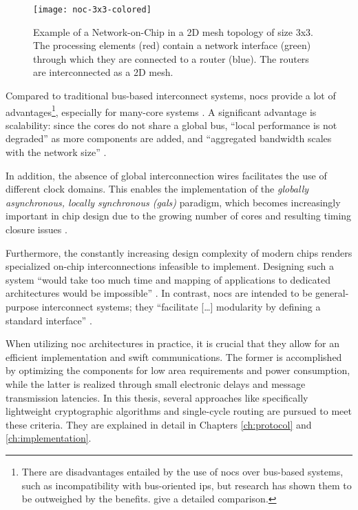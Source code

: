 \begin{figure}
    \centering
    \texttt{[image: noc-3x3-colored]}
    \caption[Example of a 3x3 mesh NoC]{Example of a Network-on-Chip in a 2D mesh topology of size 3x3. The processing elements (red) contain a network interface
    (green) through which they are connected to a router (blue). The routers are interconnected as a 2D mesh.}
    \label{fig:nocexample}
\end{figure}

Compared to traditional bus-based interconnect systems, \glspl{noc} provide a lot of advantages\footnote{There are disadvantages entailed by
the use of \glspl{noc} over bus-based systems, such as incompatibility with bus-oriented \glspl{ip}, but research has shown them to be outweighed
by the benefits. \citeauthor{tatas16designingnocs} \cite[6]{tatas16designingnocs} give a detailed comparison.}, especially for many-core systems
\cite[5\psqq]{tatas16designingnocs}. A significant advantage is scalability: since the cores do not share a global bus, \enquote{local performance is not
degraded} \cite[6]{tatas16designingnocs} as more components are added, and \enquote{aggregated bandwidth scales with the network size}
\cite[6]{tatas16designingnocs}.

In addition, the absence of global interconnection wires facilitates the use of different clock domains. This enables the implementation of the
\textit{globally asynchronous, locally synchronous (\gls{gals})} paradigm, which becomes increasingly important in chip design due to the growing
number of cores and resulting timing closure issues \cites[3]{kumar02networkonchip}[2]{ivanov05nocintroduction}.

Furthermore, the constantly increasing design complexity of modern chips \cite{mack11mooreslaw} renders specialized on-chip
interconnections infeasible to implement. Designing such a system \enquote{would take too much time and mapping of applications to dedicated
architectures would be impossible} \cite[1]{kumar02networkonchip}. In contrast, \glspl{noc} are intended to be general-purpose interconnect systems; they
\enquote{facilitate […] modularity by defining a standard interface} \cite[1]{dally01routepacketsnotwires}.

When utilizing \gls{noc} architectures in practice, it is crucial that they allow for an efficient implementation and swift communications. The
former is accomplished by optimizing the components for low area requirements and power consumption, while the latter is realized
through small electronic delays and message transmission latencies. In this thesis, several approaches like specifically lightweight cryptographic
algorithms and single-cycle routing are pursued to meet these criteria. They are explained in detail in Chapters \ref{ch:protocol} and
\ref{ch:implementation}.

